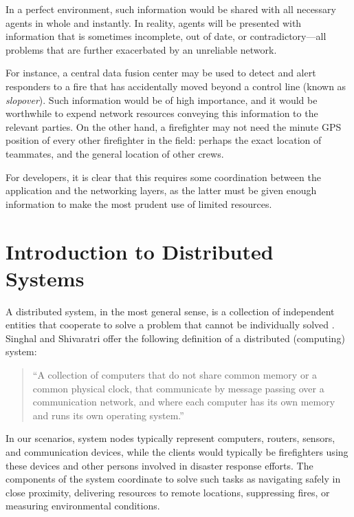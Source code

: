 \documentclass[]             %
{NASA}                       %
\theoremstyle{definition}
\begin{document}
In a perfect environment, such information would be shared with all
necessary agents in whole and instantly. In reality, agents will be
presented with information that is sometimes incomplete, out of date, or
contradictory---all problems that are further exacerbated by an
unreliable network.

For instance, a central data fusion center may be used to detect and
alert responders to a fire that has accidentally moved beyond a control
line (known as \emph{slopover}). Such information would be of high
importance, and it would be worthwhile to expend network resources
conveying this information to the relevant parties. On the other hand, a
firefighter may not need the minute GPS position of every other
firefighter in the field: perhaps the exact location of teammates, and
the general location of other crews.

For developers, it is clear that this requires some coordination between
the application and the networking layers, as the latter must be given
enough information to make the most prudent use of limited resources.

\newpage

\section{Introduction to Distributed
Systems}\label{introduction-to-distributed-systems}

\label{sec:background}

A distributed system, in the most general sense, is a collection of
independent entities that cooperate to solve a problem that cannot be
individually solved \cite{kshemkalyani_singhal_2008}. Singhal and
Shivaratri \cite{10.5555/562065} offer the following definition of a
distributed (computing) system:

\begin{quote}
``A collection of computers that do not share common memory or a common
physical clock, that communicate by message passing over a communication
network, and where each computer has its own memory and runs its own
operating system.''
\end{quote}

In our scenarios, system nodes typically represent computers, routers,
sensors, and communication devices, while the clients would typically be
firefighters using these devices and other persons involved in disaster
response efforts. The components of the system coordinate to solve such
tasks as navigating safely in close proximity, delivering resources to
remote locations, suppressing fires, or measuring environmental
conditions.
\end{document}
